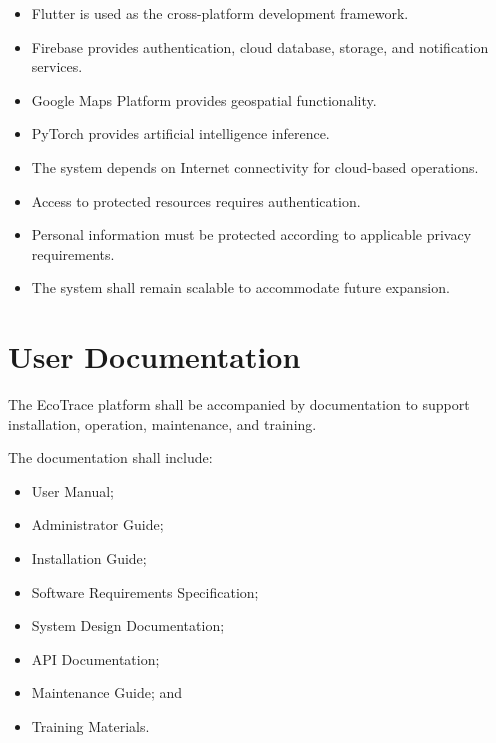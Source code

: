 \begin{itemize}

\item Flutter is used as the cross-platform development framework.

\item Firebase provides authentication, cloud database, storage, and
notification services.

\item Google Maps Platform provides geospatial functionality.

\item PyTorch provides artificial intelligence inference.

\item The system depends on Internet connectivity for cloud-based
operations.

\item Access to protected resources requires authentication.

\item Personal information must be protected according to applicable
privacy requirements.

\item The system shall remain scalable to accommodate future expansion.

\end{itemize}

\section{User Documentation}
\label{sec:user-documentation}%

The EcoTrace platform shall be accompanied by documentation to support
installation, operation, maintenance, and training.

The documentation shall include:

\begin{itemize}

\item User Manual;

\item Administrator Guide;

\item Installation Guide;

\item Software Requirements Specification;

\item System Design Documentation;

\item API Documentation;

\item Maintenance Guide; and

\item Training Materials.

\end{itemize}

